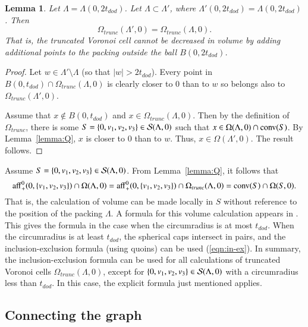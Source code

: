 \documentclass{article} %
\newtheorem{lemma}{Lemma}[subsection]
\begin{document}
\begin{lemma}\label{lemma:trunc}  
Let $\Lambda=\Lambda(0,2t_{dod})$.  Let $\Lambda\subset\Lambda'$,
where $\Lambda'(0,2t_{dod}) = \Lambda(0,2t_{dod})$.  Then
$$\Omega_{trunc}(\Lambda',0) = \Omega_{trunc}(\Lambda,0).
$$
That is, the truncated Voronoi cell cannot be decreased in volume by
adding additional points to the packing outside the ball $B(0,2t_{dod})$.
\end{lemma}

\begin{proof} Let $w\in \Lambda'\setminus\Lambda$ (so that  $|w|>2t_{dod}$).
Every point in $B(0,t_{dod})\cap \Omega_{trunc}(\Lambda,0)$ 
is clearly closer to $0$ than to $w$ so
belongs also to $\Omega_{trunc}(\Lambda',0)$.

Assume that $x\not\in B(0,t_{dod})$ and $x\in \Omega_{trunc}(\Lambda,0)$.
Then by the definition of $\Omega_{trunc}$,
there is some $S=\{0,v_1,v_2,v_3\}\in {\mathcal S}(\Lambda,0)$ such that
$x\in \Omega(\Lambda,0)\cap {\operatorname{conv}}(S)$.  By Lemma~\ref{lemma:Q},
$x$ is closer to $0$ than to $w$.  Thus, $x\in\Omega(\Lambda',0)$.
The result follows.
\end{proof}

Assume $S=\{0,v_1,v_2,v_3\}\in {\mathcal S}(\Lambda,0)$.
From Lemma~\ref{lemma:Q}, it follows that
\begin{equation}\label{eqn:omega-3}
{\operatorname{aff}}^0_+(0,\{v_1,v_2,v_3\}) \cap \Omega(\Lambda,0) = 
{\operatorname{aff}}^0_+(0,\{v_1,v_2,v_3\}) \cap \Omega_{trunc}(\Lambda,0) = 
{\operatorname{conv}}(S)\cap\Omega(S,0).
\end{equation}
That is, the calculation of volume can be made locally in $S$ without
reference to the position of the packing $\Lambda$.
A formula for this volume calculation appears in 
\cite[\S8.6.3]{Hales:1997:DCG}.  This gives the formula in the case
when the circumradius is at most $t_{dod}$.  When the circumradius
is at least $t_{dod}$, the spherical caps intersect in pairs,
and the inclusion-exclusion formula (using quoins)
can be used (\ref{eqn:in-ex}).
In summary, the inclusion-exclusion formula can be used for all
calculations of truncated Voronoi cells $\Omega_{trunc}(\Lambda,0)$,
except for $\{0,v_1,v_2,v_3\}\in {\mathcal S}(\Lambda,0)$ with
a circumradius less than $t_{dod}$.  In this case, 
the explicit formula just mentioned applies.

\subsection{Connecting the graph}
\end{document}
